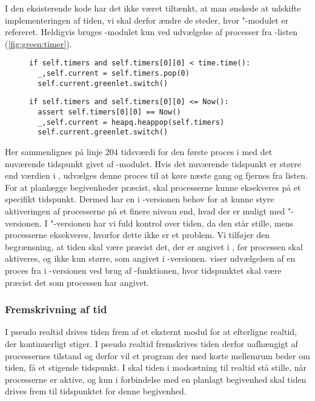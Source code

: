 I den eksisterende kode har det ikke været tiltænkt, at man ønskede at udskifte implementeringen af tiden, vi skal derfor ændre de steder, hvor "-modulet er refereret. Heldigvis bruges -modulet kun ved udvælgelse af processer fra -listen (\cref{fig:green:timer}). 
\begin{figure}[hbtp]
\begin{minipage}[c]{\linewidth}
\begin{lstlisting}[firstnumber=204, label=fig:green:timer, caption=Udvælgelse af proces fra listen timers (fra scheduling.py)]
if self.timers and self.timers[0][0] < time.time():
  _,self.current = self.timers.pop(0)
  self.current.greenlet.switch()
\end{lstlisting}
\end{minipage}
\begin{minipage}[c]{\linewidth}
\begin{lstlisting}[firstnumber=124, label=fig:sim:timer, caption=Udvælgelse af proces fra listen timers (fra simulation.py)]
if self.timers and self.timers[0][0] <= Now():
  assert self.timers[0][0] == Now()
  _,self.current = heapq.heappop(self.timers)
  self.current.greenlet.switch()
\end{lstlisting}
\end{minipage}
\end{figure}
Her sammenlignes på linje 204 tidsværdi for den første proces i  med det nuværende tidspunkt givet af -modulet.
Hvis det nuværende tidspunkt er større end værdien i , udvælges denne proces til at køre næste gang og fjernes fra listen.
For at planlægge begivenheder præcist, skal processerne kunne eksekveres på et specifikt tidspunkt. Dermed har  \sched en i -versionen behov for at kunne  styre aktiveringen af processerne på et finere niveau end, hvad der er muligt med "-versionen.  
I "-versionen har vi fuld kontrol over tiden, da  den står stille, mens processerne eksekveres, hvorfor dette ikke er et problem.
Vi  tilføjer den begrænsning, at tiden skal være præcist det, der er angivet i , før processen skal aktiveres, og ikke kun større, som angivet i -versionen.  viser udvælgelsen af en proces fra  i -versionen ved brug af -funktionen, hvor tidspunktet skal være præcist det som processen har angivet.

\subsubsection{Fremskrivning af tid}
I pseudo realtid drives tiden frem af et eksternt modul for at efterligne realtid, der kontinuerligt stiger. I pseudo realtid fremskrives tiden derfor uafhængigt af processernes tilstand og derfor vil et program der med korte mellemrum beder om tiden, få et stigende tidspunkt. I \des  skal tiden i modsætning til realtid stå stille, når processerne er aktive, og kun i forbindelse med en planlagt begivenhed skal tiden drives frem til tidspunktet for denne begivenhed.

